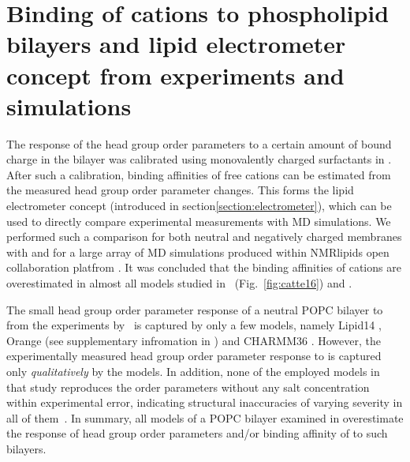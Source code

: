 \section{Binding of cations to phospholipid bilayers and lipid electrometer concept from experiments and simulations}
\label{section:electrometer_exp_sim} 

The response of the head group order parameters 
to a certain amount of bound charge in the bilayer 
was calibrated using monovalently charged surfactants in \citep{scherer89}. 
After such a calibration,
binding affinities of free cations can be estimated from the measured head group order parameter changes. \citep{scherer89}
This forms the lipid electrometer concept (introduced in section\ref{section:electrometer}),
which can be used to directly compare experimental measurements with MD simulations. 
We performed such a comparison for both neutral and negatively charged membranes with  and  
for a large array of MD simulations produced within NMRlipids open collaboration platfrom \citep{nmrlipids}. 
It was concluded  that the binding affinities of cations are overestimated in almost all models studied in~\citep{catte16} (Fig.~\ref{fig:catte16}) and \citep{nmrlipids_proj4}. 


The small head group order parameter response of a neutral POPC bilayer to  from the experiments by~\citet{seelig87} is captured by only a few models, 
namely Lipid14 \citep{dickson14}, Orange (see supplementary infromation in \citep{catte16}) and CHARMM36 \citep{klauda10}. 
However, the experimentally measured head group order parameter response to  is captured only \emph{qualitatively} by the models. \citep{catte16}
In addition, none of the employed models in that study reproduces the order parameters without any salt concentration
within experimental error, indicating structural inaccuracies of varying severity in all of them~\citep{botan15}.
In summary, all models of a POPC bilayer examined in \citep{catte16} 
overestimate the response of head group order parameters and/or binding affinity of  to such bilayers. 



